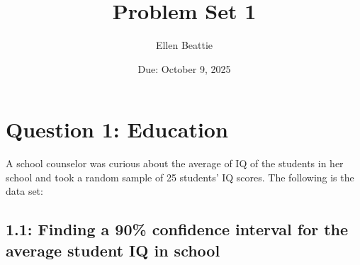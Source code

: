 \documentclass[12pt,letterpaper]{article}
\title{Problem Set 1}
\date{Due: October 9, 2025}
\author{Ellen Beattie}
\begin{document}
	\maketitle
	
	\section*{Question 1: Education}

A school counselor was curious about the average of IQ of the students in her school and took a random sample of 25 students' IQ scores. The following is the data set:\\
\vspace{.25cm}

  

\vspace{0.5cm} 

\noindent
\subsection*{1.1: Finding a 90\% confidence interval for the average student IQ in school}
\vspace*{0.3cm}
\end{document}
